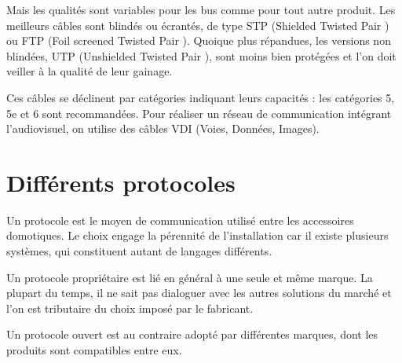 \documentclass[12pt]{article}
\begin{document}
Mais les qualités sont variables pour les bus comme pour tout autre produit. Les meilleurs câbles sont blindés ou écrantés, de type STP (Shielded Twisted Pair ) ou FTP (Foil screened Twisted Pair ). Quoique plus répandues, les versions non blindées, UTP (Unshielded Twisted Pair ), sont moins bien protégées et l’on doit veiller à la qualité de leur gainage.

Ces câbles se déclinent par catégories indiquant leurs capacités : les catégories 5, 5e et 6 sont recommandées. Pour réaliser un réseau de communication intégrant l’audiovisuel, on utilise des câbles VDI (Voies, Données, Images).

\section{Différents protocoles}
Un protocole est le moyen de communication utilisé entre les accessoires domotiques. Le choix engage la pérennité de l’installation car il existe plusieurs systèmes, qui constituent autant de langages différents.

Un protocole propriétaire est lié en général à une seule et même marque. La plupart du temps, il ne sait pas dialoguer avec les autres solutions du marché et l’on est tributaire du choix imposé par le fabricant.

Un protocole ouvert est au contraire adopté par différentes marques, dont les produits sont compatibles entre eux.
\newpage


\end{document}
